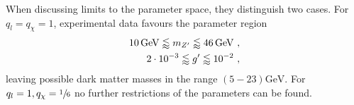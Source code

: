 When discussing limits to the parameter space, they distinguish two cases. For $q_l=q_\chi=1$, experimental data favours the parameter region
\begin{align}\label{eq:Boundg}
	\SI{10}{\giga\electronvolt}\lessapprox m_{Z'} \lessapprox\SI{46}{\giga\electronvolt} \ , \notag \\
	\SI{2e-3}{}\lessapprox g' \lessapprox\SI{e-2}{} \ ,
\end{align}
leaving possible dark matter masses in the range $(5-23)\si{\giga\electronvolt}$. For $q_l=1,q_\chi=\sfrac{1}{6}$ no further restrictions of the parameters can be found.

